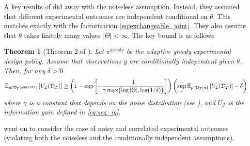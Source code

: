 \documentclass[a4paper, 10pt]{report}
\theoremstyle{plain}
\newtheorem{theorem}{Theorem}[chapter]
\begin{document}
	A key results of \citet{chen2015sequential} did away with the noiseless assumption.
	Instead, they assumed that different experimental outcomes are independent conditional on $\theta$. This matches exactly with the factorisation \eqref{eq:exchangeable_joint}. They also assume that $\theta$ takes finitely many values $|\Theta|<\infty$. The key bound is as follows
	\begin{theorem}[Theorem 2 of \citet{chen2015sequential}]
		Let $\pi^\text{greedy}$ be the adaptive greedy experimental design policy. Assume that observations $y$ are conditionally independent given $\theta$.
		Then, for any $\delta > 0$
		\begin{equation}
		\begin{split}
		\mathbb{E}_{p(\mathcal{D}_T|\pi^\text{greedy})}\left[ U_\mathcal{I}(\mathcal{D}_T) \right]
		\ge \left(1 - \exp\left[-\frac{1}{\gamma \max \{\log |\Theta|, \log (1/\delta)\}} \right] \right)\left(\sup_\pi \mathbb{E}_{p(\mathcal{D}_T|\pi)}\left[ U_\mathcal{I}(\mathcal{D}_T) \right] - \delta \right)
		\end{split}
		\end{equation}
		where $\gamma$ is a constant that depends on the noise distribution (see \citet{chen2015sequential}), and $U_\mathcal{I}$ is the information gain defined in \eqref{eq:seq_ig}.
	\end{theorem}
	\citet{chen2017near} went on to consider the case of noisy and correlated experimental outcomes (violating both the noiseless and the conditionally independent assumptions). %
	
\end{document}

